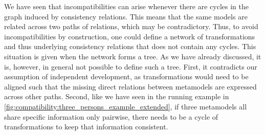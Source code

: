 We have seen that incompatibilities can arise whenever there are cycles in the graph induced by consistency relations.
This means that the same models are related across two paths of relations, which may be contradictory.
Thus, to avoid incompatibilities by construction, one could define a network of transformations and thus underlying consistency relations that does not contain any cycles.
This situation is given when the network forms a tree.
As we have already discussed, it is, however, in general not possible to define such a tree.
First, it contradicts our assumption of independent development, as transformations would need to be aligned such that the missing direct relations between metamodels are expressed across other paths.
Second, like we have seen in the running example in \autoref{fig:compatibility:three_persons_example_extended}, if three metamodels all share specific information only pairwise, there needs to be a cycle of transformations to keep that information consistent.

